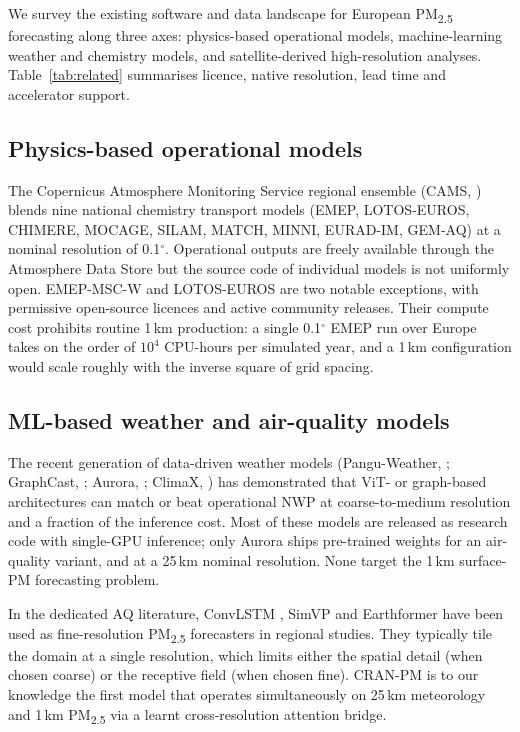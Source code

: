 
We survey the existing software and data landscape for European
PM\textsubscript{2.5} forecasting along three axes: physics-based
operational models, machine-learning weather and chemistry models, and
satellite-derived high-resolution analyses. Table~\ref{tab:related}
summarises licence, native resolution, lead time and accelerator support.

\subsection{Physics-based operational models}

The Copernicus Atmosphere Monitoring Service regional ensemble (CAMS,
\citealp{cams}) blends nine national chemistry transport models
(EMEP, LOTOS-EUROS, CHIMERE, MOCAGE, SILAM, MATCH, MINNI, EURAD-IM,
GEM-AQ) at a nominal resolution of 0.1$^\circ$. Operational outputs are
freely available through the Atmosphere Data Store but the source
code of individual models is not uniformly open. EMEP-MSC-W
\citep{simpson2012emep} and LOTOS-EUROS \citep{schaap2008lotos} are
two notable exceptions, with permissive open-source licences and
active community releases. Their compute cost prohibits routine
1\,km production: a single 0.1$^\circ$ EMEP run over Europe takes
on the order of $10^4$ CPU-hours per simulated year, and a 1\,km
configuration would scale roughly with the inverse square of grid
spacing.

\subsection{ML-based weather and air-quality models}

The recent generation of data-driven weather models (Pangu-Weather,
\citealp{bi2023pangu}; GraphCast, \citealp{lam2023graphcast};
Aurora, \citealp{bodnar2024aurora}; ClimaX, \citealp{nguyen2023climax})
has demonstrated that ViT- or graph-based architectures can match or
beat operational NWP at coarse-to-medium resolution and a fraction of
the inference cost. Most of these models are released as research
code with single-GPU inference; only Aurora ships pre-trained weights
for an air-quality variant, and at a 25\,km nominal resolution. None
target the 1\,km surface-PM forecasting problem.

In the dedicated AQ literature, ConvLSTM \citep{shi2015convlstm},
SimVP \citep{gao2022simvp} and Earthformer \citep{gao2022earthformer}
have been used as fine-resolution PM\textsubscript{2.5} forecasters
in regional studies. They typically tile the domain at a single
resolution, which limits either the spatial detail (when chosen
coarse) or the receptive field (when chosen fine). CRAN-PM is to our
knowledge the first model that operates simultaneously on 25\,km
meteorology and 1\,km PM\textsubscript{2.5} via a learnt
cross-resolution attention bridge.

